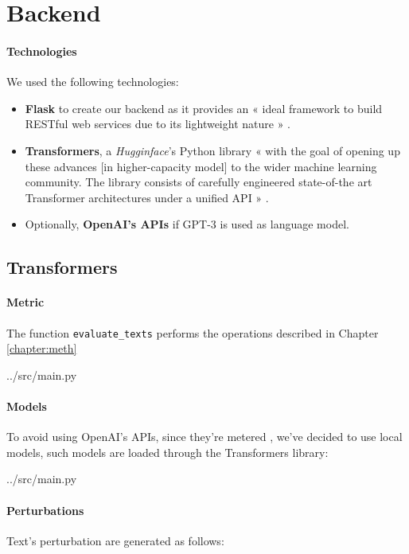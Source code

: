 \section{Backend}

\paragraph{Technologies}
We used the following technologies:

\begin{itemize}
	\item \textbf{Flask} to create our backend as it provides an « ideal framework to build RESTful web services due to its lightweight nature » \cite{grinberg2018flask}.
	
	\item \textbf{Transformers}, a \textit{Hugginface}'s Python library « with the
	goal of opening up these advances [in higher-capacity model] to the
	wider machine learning community. The library consists of carefully engineered state-of-the art Transformer architectures under a
	unified API » \cite{wolf2020huggingfaces}.
	
	\item Optionally, \textbf{OpenAI's APIs} if GPT-3 is used as language model.
\end{itemize}

\subsection{Transformers}

\paragraph{Metric}
The function \texttt{evaluate\_texts} performs the operations described in Chapter \ref{chapter:meth}


{../src/main.py}

\paragraph{Models}
To avoid using OpenAI's APIs, since they're metered \cite{openaiprice}, we've decided to use local models, such models are loaded through the Transformers library:


{../src/main.py}

\paragraph{Perturbations}
Text's perturbation are generated as follows:

